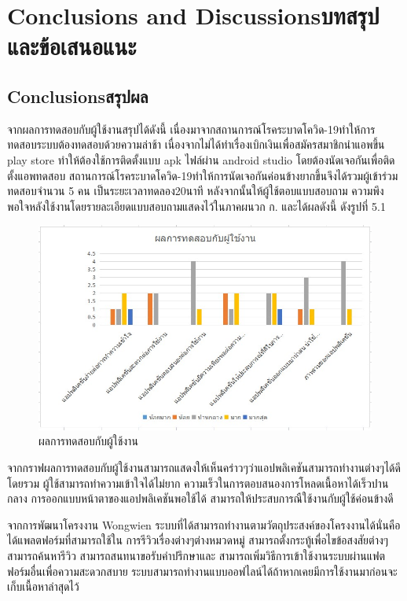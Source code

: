 \chapter{\ifenglish Conclusions and Discussions\else บทสรุปและข้อเสนอแนะ\fi}

\section{\ifenglish Conclusions\else สรุปผล\fi}

จากผลการทดสอบกับผู้ใช้งานสรุปได้ดังนี้
เนื่องมาจากสถานการณ์โรคระบาดโควิด-19ทำให้การทดสอบระบบต้องทดสอบด้วยความล่าช้า
เนื่องจากไม่ได้ทำเรื่องเบิกเงินเพื่อสมัครสมาชิกนำแอพขึ้น play store ทำให้ต้องใช้การติดตั้งแบบ apk ไฟล์ผ่าน android studio
โดยต้องนัดเจอกันเพื่อติดตั้งแอพทดสอบ สถานการณ์โรคระบาดโควิด-19ทำให้การนัดเจอกันค่อนข้างยากขึ้นจึงได้รวมผู้เข้าร่วมทดสอบจำนวน 5 คน เป็นระยะเวลาทดลอง20นาที หลังจากนั้นให้ผู้ใช้ตอบแบบสอบถาม
ความพึงพอใจหลังใช้งานโดยรายละเอียดแบบสอบถามแสดงไว้ในภาคผนวก ก. และได้ผลดังนี้ ดังรูปที่
5.1


\begin{figure}
    \begin{center}
      \includegraphics[width=1\textwidth]{./image/form/result_reviews.jpg}
    \end{center}
    \caption[ผลการทดสอบกับผู้ใช้งาน]{ผลการทดสอบกับผู้ใช้งาน}
    \end{figure}

    จากกราฟผลการทดสอบกับผู้ใช้งานสามารถแสดงให้เห็นคร่าวๆว่าแอปพลิเคชันสามารถทำงานต่างๆได้ดีโดยรวม 
    ผู้ใช้สามารถทำความเข้าใจได้ไม่ยาก ความเร็วในการตอบสนองการโหลดเนื้อหาได้เร็วปานกลาง การออกแบบหน้าตาของแอปพลิเคชันพอใช้ได้
    สามารถให้ประสบการณืใช้งานกับผู้ใช้ค่อนข้างดี 

    จากการพัฒนาโครงงาน Wongwien ระบบที่ได้สามารถทำงานตามวัตถุประสงค์ของโครงงานได้นั่นคือได้แพลตฟอร์มที่สามารถใช้ใน
    การรีวิวเรื่องต่างๆต่างหมวดหมู่ สามารถตั้งกระทู้เพื่อไขข้อสงสัยต่างๆ สามารถค้นหารีวิว สามารถสนทนาขอรับคำปรึกษาและ
    สามารถเพิ่มวิธีการเข้าใช้งานระบบผ่านแฟตฟอร์มอื่นเพื่อความสะดวกสบาย ระบบสามารถทำงานแบบออฟไลน์ได้ถ้าหากเคยมีการใช้งานมาก่อนจะเก็บเนื้อหาล่าสุดไว้

